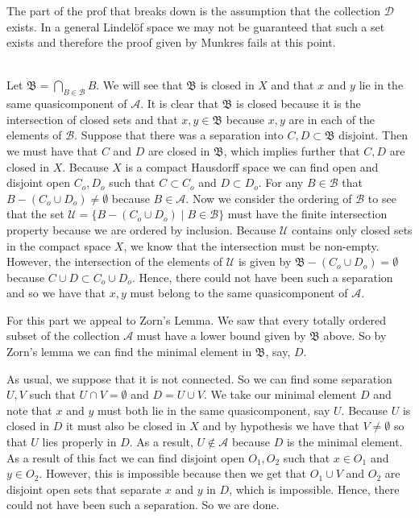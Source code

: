 \documentclass{article}
\DeclareMathOperator{\suchthat}{\mathrel{|}}
\newcommand{\problem}[1]{\noindent{\textbf{Problem #1}}\\}
\newcommand{\problempart}[1]{\noindent{\textbf{(#1)}}}
\begin{document}
\problempart{c} The part of the prof that breaks down is the assumption that the collection $\mathcal{D}$ exists. In a general Lindel\"{o}f space we may not be guaranteed that such a set exists and therefore the proof given by Munkres fails at this point.

\problem{5.37.4}
\problempart{a} Let $\mathfrak{B} = \bigcap_{B \in \mathcal{B}} B$. We will see that $\mathfrak{B}$ is closed in $X$ and that $x$ and $y$ lie in the same quasicomponent of $\mathcal{A}$. It is clear that $\mathfrak{B}$ is closed because it is the intersection of closed sets and that $x,y \in \mathfrak{B}$ because $x,y$ are in each of the elements of $\mathcal{B}$. Suppose that there was a separation into $C, D \subset \mathfrak{B}$ disjoint. Then we must have that $C$ and $D$ are closed in $\mathfrak{B}$, which implies further that $C,D$ are closed in $X$. Because $X$ is a compact Hausdorff space we can find open and disjoint open $C_o,D_o$ such that $C \subset C_o$ and $D \subset D_o$. For any $B \in \mathcal{B}$ that $B - (C_o \cup D_o) \neq \emptyset$ because $B \in \mathcal{A}$. Now we consider the ordering of $\mathcal{B}$ to see that the set $\mathcal{U} = \{B - (C_o \cup D_o) \suchthat B \in \mathcal{B}\}$ must have the finite intersection property because we are ordered by inclusion. Because $\mathcal{U}$ contains only closed sets in the compact space $X$, we know that the intersection must be non-empty. However, the intersection of the elements of $\mathcal{U}$ is given by $\mathfrak{B} - (C_o \cup D_o) = \emptyset$ because $C \cup D \subset C_o \cup D_o$. Hence, there could not have been such a separation and so we have that $x,y$ must belong to the same quasicomponent of $\mathcal{A}$.

\problempart{b} For this part we appeal to Zorn's Lemma. We saw that every totally ordered subset of the collection $\mathcal{A}$ must have a lower bound given by $\mathfrak{B} $ above. So by Zorn's lemma we can find the minimal element in $\mathfrak{B}$, say, $D$. 

\problempart{c} As usual, we suppose that it is not connected. So we can find some separation $U,V$ such that $U\cap V = \emptyset$ and $D = U \cup V$.    We take our minimal element $D$ and note that $x$ and $y$ must both lie in the same quasicomponent, say $U$. Because $U$ is closed in $D$ it must also be closed in $X$ and by hypothesis we have that $V \neq \emptyset$ so that $U$ lies properly in $D$. As a result, $U \not\in \mathcal{A}$ because $D$ is the minimal element. As a result of this fact we can find disjoint open $O_1, O_2 $ such that $x \in O_1$ and $y \in O_2$. However, this is impossible because then we get that $O_1 \cup V$ and $O_2$ are disjoint open sets that separate $x$ and $y$ in $D$, which is impossible. Hence, there could not have been such a separation. So we are done. 
\end{document}
